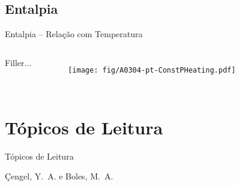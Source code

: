 \subsection{Entalpia}

    \begin{frame}{Entalpia -- Relação com Temperatura}\vspace*{-2em}
        \begin{columns}
        Filler...
            \begin{figure}
                \texttt{[image: fig/A0304-pt-ConstPHeating.pdf]}
            \end{figure}
        \end{columns}
    \end{frame}

\section{Tópicos de Leitura}

    \begin{frame}[allowframebreaks]{Tópicos de Leitura}
        \begin{thebibliography}{Çengel, Y.~A., 2013}
                Çengel, Y.~A. e Boles, M.~A.
        \end{thebibliography}
    \end{frame}




